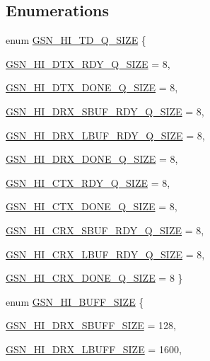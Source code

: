 \subsection*{Enumerations}
\begin{DoxyCompactItemize}
\item 
enum \hyperlink{a00504_a3b998e699fabd8ac8a6463c5645113a0}{GSN\_\-HI\_\-TD\_\-Q\_\-SIZE} \{ \par
\hyperlink{a00504_a3b998e699fabd8ac8a6463c5645113a0adb05a0a98aa19d5b26468e4f229578ca}{GSN\_\-HI\_\-DTX\_\-RDY\_\-Q\_\-SIZE} =  8, 
\par
\hyperlink{a00504_a3b998e699fabd8ac8a6463c5645113a0aebe6250ea6b40cfb0d708fab7ea70273}{GSN\_\-HI\_\-DTX\_\-DONE\_\-Q\_\-SIZE} =  8, 
\par
\hyperlink{a00504_a3b998e699fabd8ac8a6463c5645113a0a57988ca60743c9bde377391f8e404561}{GSN\_\-HI\_\-DRX\_\-SBUF\_\-RDY\_\-Q\_\-SIZE} =  8, 
\par
\hyperlink{a00504_a3b998e699fabd8ac8a6463c5645113a0a1baf70d44bfdf7ae99453e3131d28e57}{GSN\_\-HI\_\-DRX\_\-LBUF\_\-RDY\_\-Q\_\-SIZE} =  8, 
\par
\hyperlink{a00504_a3b998e699fabd8ac8a6463c5645113a0aadd4f8c99bf54bb3241e7d17b7b405b3}{GSN\_\-HI\_\-DRX\_\-DONE\_\-Q\_\-SIZE} =  8, 
\par
\hyperlink{a00504_a3b998e699fabd8ac8a6463c5645113a0ab55b2008d0889fc86c250135941c5bad}{GSN\_\-HI\_\-CTX\_\-RDY\_\-Q\_\-SIZE} =  8, 
\par
\hyperlink{a00504_a3b998e699fabd8ac8a6463c5645113a0a19875a72deff70604132ffeb11f59b11}{GSN\_\-HI\_\-CTX\_\-DONE\_\-Q\_\-SIZE} =  8, 
\par
\hyperlink{a00504_a3b998e699fabd8ac8a6463c5645113a0a1d31ce26675049a23087eb9b632dde4a}{GSN\_\-HI\_\-CRX\_\-SBUF\_\-RDY\_\-Q\_\-SIZE} =  8, 
\par
\hyperlink{a00504_a3b998e699fabd8ac8a6463c5645113a0abd3cc8ddc734b511245f331b06663dda}{GSN\_\-HI\_\-CRX\_\-LBUF\_\-RDY\_\-Q\_\-SIZE} =  8, 
\par
\hyperlink{a00504_a3b998e699fabd8ac8a6463c5645113a0a246b30db176c13630ef9b0b36e9437f2}{GSN\_\-HI\_\-CRX\_\-DONE\_\-Q\_\-SIZE} =  8
 \}
\item 
enum \hyperlink{a00504_a08d83a81fbc89f1d44c527a3f5ee68e9}{GSN\_\-HI\_\-BUFF\_\-SIZE} \{ \par
\hyperlink{a00504_a08d83a81fbc89f1d44c527a3f5ee68e9ae722ffbaba09e88f2d0e3bd21723e5de}{GSN\_\-HI\_\-DRX\_\-SBUFF\_\-SIZE} =  128, 
\par
\hyperlink{a00504_a08d83a81fbc89f1d44c527a3f5ee68e9a849863beb077e95f467314f93fd17761}{GSN\_\-HI\_\-DRX\_\-LBUFF\_\-SIZE} =  1600, 

\end{DoxyCompactItemize}
